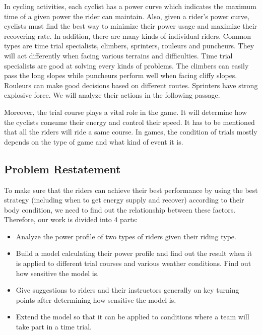 \documentclass[12pt]{article}
\theoremstyle{definition}
\theoremstyle{remark}
\numberwithin{equation}{section}
\begin{document}
	In cycling activities, each cyclist has a power curve which indicates the maximum time of a given power the rider can maintain. Also, given a rider's power curve, cyclists must find the best way to minimize their power usage and maximize their recovering rate. In addition, there are many kinds of individual riders. Common types are time trial specialists, climbers, sprinters, rouleurs and puncheurs. They will act differently when facing various terrains and difficulties. Time trial specialists are good at solving every kinds of problems. The climbers can easily pass the long slopes while puncheurs perform well when facing cliffy slopes. Rouleurs can make good decisions based on different routes. Sprinters have strong explosive force. We will analyze their actions in the following passage.
	
	Moreover, the trial course plays a vital role in the game. It will determine how the cyclists consume their energy and control their speed. It has to be mentioned that all the riders will ride a same course. In games, the condition of trials mostly depends on the type of game and what kind of event it is.
	\subsection{Problem Restatement}
	To make sure that the riders can achieve their best performance by using the best strategy (including when to get energy supply and recover) according  to their body condition, we need to find out the relationship between these factors. Therefore, our work is divided into 4 parts:
	\begin{itemize}
		\item  Analyze the power profile of two types of riders given their riding type.
		\item  Build a model calculating their power profile and find out the result when it is applied to different trial courses and various weather conditions. Find out how sensitive the model is.
		\item  Give suggestions to riders and their instructors generally on key turning points after determining how sensitive the model is.
		\item  Extend the model so that it can be applied to conditions where a team will take part in a time trial.
	\end{itemize}
\end{document}

